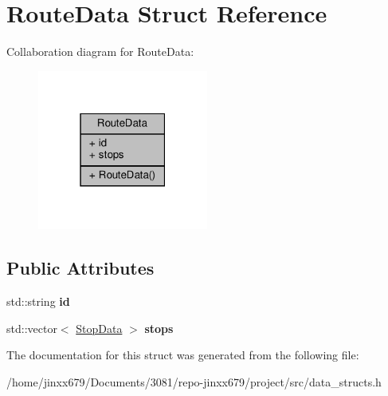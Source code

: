 \hypertarget{structRouteData}{}\section{Route\+Data Struct Reference}
\label{structRouteData}


Collaboration diagram for Route\+Data\+:\nopagebreak
\begin{figure}[H]
\begin{center}
\leavevmode
\includegraphics[width=159pt]{structRouteData__coll__graph}
\end{center}
\end{figure}
\subsection*{Public Attributes}
\begin{DoxyCompactItemize}
\item 
\mbox{\label{structRouteData_a578af871a15d4737ab8d2074887da85f}} 
std\+::string {\bfseries id}
\item 
\mbox{\label{structRouteData_af867789789fbcfe97bdd554e56b121bf}} 
std\+::vector$<$ \hyperlink{structStopData}{Stop\+Data} $>$ {\bfseries stops}
\end{DoxyCompactItemize}


The documentation for this struct was generated from the following file\+:\begin{DoxyCompactItemize}
\item 
/home/jinxx679/\+Documents/3081/repo-\/jinxx679/project/src/data\+\_\+structs.\+h\end{DoxyCompactItemize}
